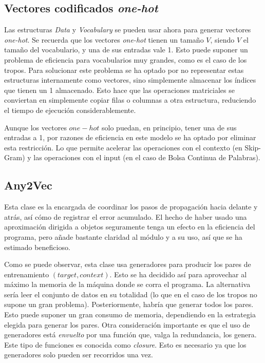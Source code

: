 \subsection{Vectores codificados \textit{one-hot}}

Las estructuras \textit{Data} y \textit{Vocabulary} se pueden usar ahora para generar vectores \textit{one-hot}. Se recuerda que los vectores \textit{one-hot} tienen un tamaño $V$, siendo $V$ el tamaño del vocabulario, y
una de sus entradas vale 1. Esto puede suponer un problema de eficiencia para vocabularios muy grandes, como es el caso de los tropos. Para solucionar este problema se ha optado por no representar
estas estructuras internamente como vectores, sino simplemente almacenar los índices que tienen un 1 almacenado. Esto hace que las operaciones matriciales se conviertan en simplemente copiar filas o columnas a otra estructura, reduciendo el tiempo de ejecución considerablemente.

Aunque los vectores $one-hot$ solo puedan, en principio, tener una de sus entradas a 1, por razones de eficiencia en este modelo se ha optado por eliminar esta restricción. Lo que permite acelerar
las operaciones con el contexto (en Skip-Gram) y las operaciones con el input (en el caso de Bolsa Continua de Palabras).

\subsection{Any2Vec}

Esta clase es la encargada de coordinar los pasos de propagación hacia delante y atrás, así cómo de registrar el error acumulado. El hecho de haber usado una aproximación dirigida a objetos
seguramente tenga un efecto en la eficiencia del programa, pero añade bastante claridad al módulo y a su uso, así que se ha estimado beneficioso.

Como se puede observar, esta clase usa generadores para producir los pares de entrenamiento $(target, context)$. Esto se ha decidido así para aprovechar al máximo la memoria de la máquina donde
se corra el programa. La alternativa sería leer el conjunto de datos en su totalidad (lo que en el caso de los tropos no supone un gran problema). Posteriormente, habría que generar todos los pares.
Esto puede suponer un gran consumo de memoria, dependiendo en la estrategia elegida para generar los pares. Otra consideración importante es que el uso de generadores está \textit{envuelto} por una
función que, valga la redundancia, los genera. Este tipo de funciones es conocida como \textit{closure}. Esto es necesario ya que los generadores solo pueden ser recorridos una vez.

